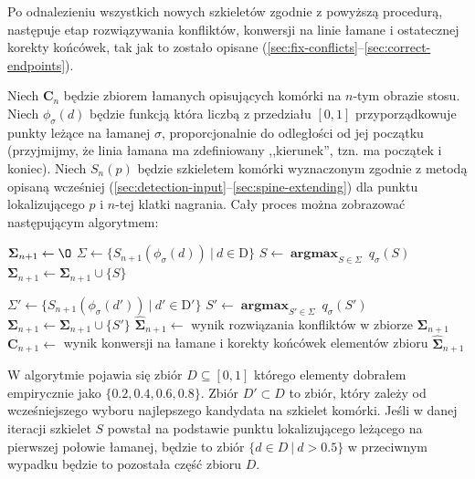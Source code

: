 \documentclass[declaration,shortabstract,mgr]{iithesis}
\DeclareMathOperator*{\argmax}{\textbf{argmax}}
\begin{document}
Po odnalezieniu wszystkich nowych szkieletów zgodnie z powyższą procedurą, następuje etap rozwiązywania konfliktów, konwersji na linie łamane i ostatecznej korekty końcówek, tak jak to zostało opisane (\ref{sec:fix-conflicts}--\ref{sec:correct-endpoints}).


Niech $\mathbf{C}_n$ będzie zbiorem łamanych opisujących komórki na $n$-tym obrazie stosu.
Niech $\phi_\sigma(d)$ będzie funkcją która liczbą z przedziału $[0, 1]$ przyporządkowuje punkty leżące na łamanej $\sigma$, proporcjonalnie do odległości od jej początku (przyjmijmy, że linia łamana ma zdefiniowany ,,kierunek'', tzn. ma początek i koniec). Niech $S_n(p)$ będzie szkieletem komórki wyznaczonym zgodnie z metodą opisaną wcześniej (\ref{sec:detection-input}--\ref{sec:spine-extending}) dla punktu lokalizującego $p$ i $n$-tej klatki nagrania.
Cały proces można zobrazować następującym algorytmem:

\begin{algorithm}[H]
\begin{algorithmic}

  \STATE $\mathbf{\Sigma}_{n+1} \gets \O$
    \STATE $\Sigma \gets \{ S_{n+1}(\phi_\sigma(d)) \ | \ d \in \text{D} \}$
    \STATE $S \gets \argmax_{S \in \Sigma} \ q_\sigma(S)$
    \STATE $\mathbf{\Sigma}_{n+1} \gets \mathbf{\Sigma}_{n+1} \cup \{ S \}$

      \STATE $\Sigma' \gets \{ S_{n+1}(\phi_\sigma(d')) \ | \ d' \in \text{D}' \}$
      \STATE $S' \gets \argmax_{S' \in \Sigma} \ q_\sigma(S')$
      \STATE $\mathbf{\Sigma}_{n+1} \gets \mathbf{\Sigma}_{n+1} \cup \{ S' \}$
    \ENDIF
  \ENDFOR
  \STATE $\mathbf{\hat{\Sigma}}_{n+1} \gets$ wynik rozwiązania konfliktów w zbiorze $\mathbf{\Sigma}_{n+1}$
  \STATE $\mathbf{C}_{n+1} \gets$ wynik konwersji na łamane i korekty końcówek elementów zbioru $\mathbf{\hat{\Sigma}}_{n+1}$
\ENDFOR

\end{algorithmic}
\end{algorithm}

\noindent
W algorytmie pojawia się zbiór $D \subseteq [0, 1]$ którego elementy dobrałem empirycznie jako $\{ 0.2, 0.4, 0.6, 0.8 \}$.
Zbiór $D' \subset D$ to zbiór, który zależy od wcześniejszego wyboru najlepszego kandydata na szkielet komórki.
Jeśli w danej iteracji szkielet $S$ powstał na podstawie punktu lokalizującego leżącego na pierwszej połowie łamanej, będzie to zbiór $\{ d \in D \ | \ d > 0.5 \}$ w przeciwnym wypadku będzie to pozostała część zbioru $D$.
\end{document}
